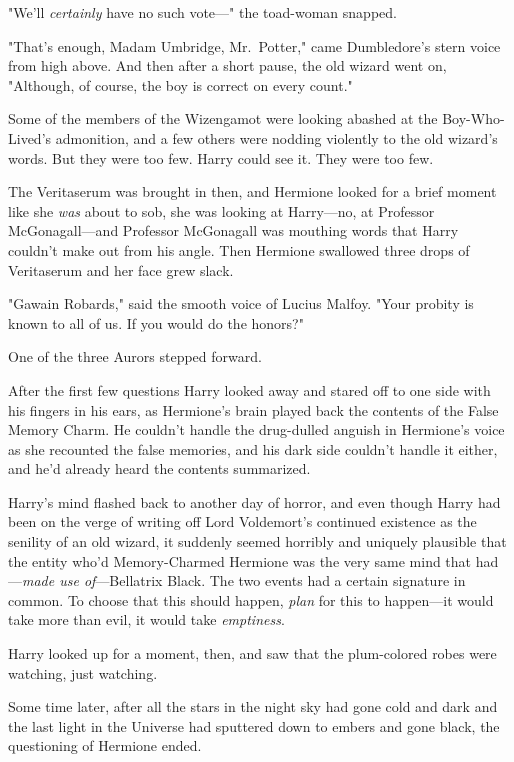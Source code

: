 "We'll \emph{certainly} have no such vote---" the toad-woman snapped.

"That's enough, Madam Umbridge, Mr.~Potter," came Dumbledore's stern voice from 
high above. And then after a short pause, the old wizard went on, "Although, of 
course, the boy is correct on every count."

Some of the members of the Wizengamot were looking abashed at the 
Boy-Who-Lived's admonition, and a few others were nodding violently to the old 
wizard's words. But they were too few. Harry could see it. They were too few.

The Veritaserum was brought in then, and Hermione looked for a brief moment 
like she \emph{was} about to sob, she was looking at Harry---no, at Professor 
McGonagall---and Professor McGonagall was mouthing words that Harry couldn't 
make out from his angle. Then Hermione swallowed three drops of Veritaserum and 
her face grew slack.

"Gawain Robards," said the smooth voice of Lucius Malfoy. "Your probity is 
known to all of us. If you would do the honors?"

One of the three Aurors stepped forward.

After the first few questions Harry looked away and stared off to one side with 
his fingers in his ears, as Hermione's brain played back the contents of the 
False Memory Charm. He couldn't handle the drug-dulled anguish in Hermione's 
voice as she recounted the false memories, and his dark side couldn't handle it 
either, and he'd already heard the contents summarized.

Harry's mind flashed back to another day of horror, and even though Harry had 
been on the verge of writing off Lord Voldemort's continued existence as the 
senility of an old wizard, it suddenly seemed horribly and uniquely plausible 
that the entity who'd Memory-Charmed Hermione was the very same mind that 
had---\emph{made use of}---Bellatrix Black. The two events had a certain 
signature in common. To choose that this should happen, \emph{plan} for this to 
happen---it would take more than evil, it would take \emph{emptiness}.

Harry looked up for a moment, then, and saw that the plum-colored robes were 
watching, just watching.

Some time later, after all the stars in the night sky had gone cold and dark 
and the last light in the Universe had sputtered down to embers and gone black, 
the questioning of Hermione ended.

